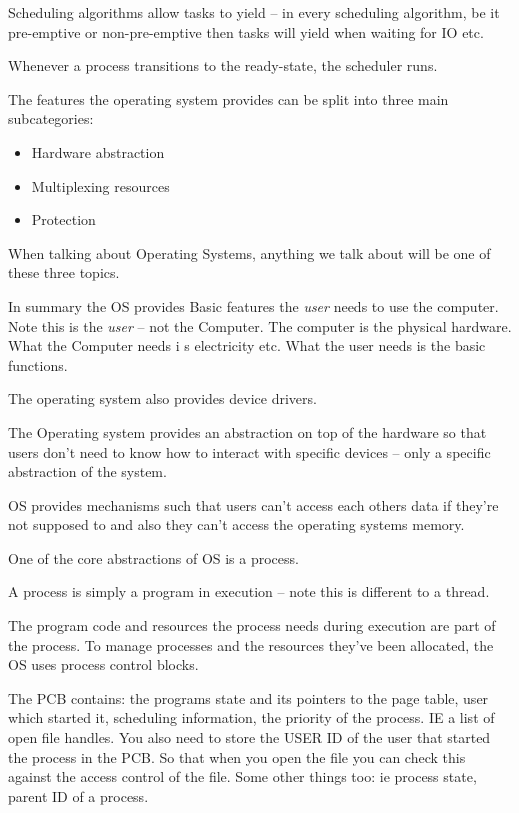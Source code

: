 \documentclass[10pt,\jkfside,a4paper]{article}
\begin{document}
Scheduling algorithms allow tasks to yield -- in every scheduling algorithm, be it 
pre-emptive or non-pre-emptive then tasks will yield when waiting for IO etc.

Whenever a process transitions to the ready-state, the scheduler runs.

The features the operating system provides can be split into three main subcategories:

\begin{itemize}

\item Hardware abstraction

\item Multiplexing resources

\item Protection

\end{itemize}

When talking about Operating Systems, anything we talk about will be one of these three topics.

\vspace{0.5cm}

In summary the OS provides Basic features the \textit{user} needs to use the computer.
Note this is the \textit{user} -- not the Computer. The computer is the physical hardware. 
What the Computer needs i s electricity etc. What the user needs is the basic functions.

The operating system also provides device drivers.

The Operating system provides an abstraction on top of the hardware so that users 
don't need to know how to interact with specific devices -- only a 
specific abstraction of the system.

OS provides mechanisms such that users can't access each others data if 
they're not supposed to and also they can't access the operating systems memory.

One of the core abstractions of OS is a process. 

A process is simply a program in execution -- note this is different to a thread.

The program code and resources the process needs during execution are part of the process. 
To manage processes and the resources they've been allocated, the OS uses process control blocks.

The PCB contains:
the programs state and its pointers to the page table, user which started it, scheduling information, 
the priority of the process. IE a list of open file handles.
You also need to store the USER ID of the user that started the process in the PCB. So that 
when you open the file you can check this against the access control of the file.
Some other things too: ie process state, parent ID of a process.
\end{document}
